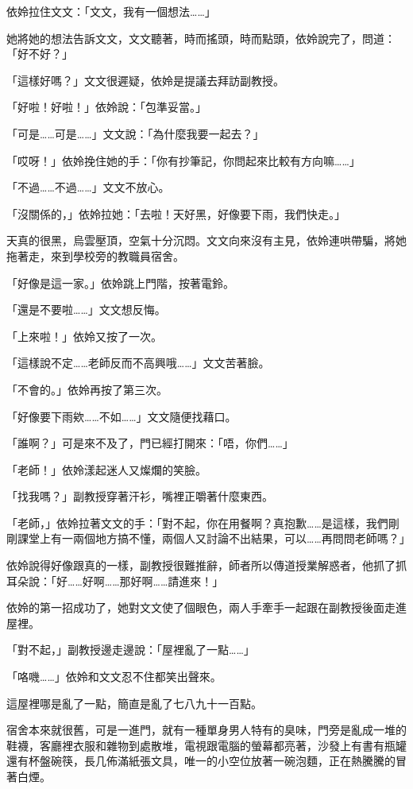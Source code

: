 依姈拉住文文：「文文，我有一個想法……」

她將她的想法告訴文文，文文聽著，時而搖頭，時而點頭，依姈說完了，問道：「好不好？」

「這樣好嗎？」文文很遲疑，依姈是提議去拜訪副教授。

「好啦！好啦！」依姈說：「包準妥當。」

「可是……可是……」文文說：「為什麼我要一起去？」

「哎呀！」依姈挽住她的手：「你有抄筆記，你問起來比較有方向嘛……」

「不過……不過……」文文不放心。

「沒關係的，」依姈拉她：「去啦！天好黑，好像要下雨，我們快走。」

天真的很黑，烏雲壓頂，空氣十分沉悶。文文向來沒有主見，依姈連哄帶騙，將她拖著走，來到學校旁的教職員宿舍。

「好像是這一家。」依姈跳上門階，按著電鈴。

「還是不要啦……」文文想反悔。

「上來啦！」依姈又按了一次。

「這樣說不定……老師反而不高興哦……」文文苦著臉。

「不會的。」依姈再按了第三次。

「好像要下雨欸……不如……」文文隨便找藉口。

「誰啊？」可是來不及了，門已經打開來：「唔，你們……」

「老師！」依姈漾起迷人又燦爛的笑臉。

「找我嗎？」副教授穿著汗衫，嘴裡正嚼著什麼東西。

「老師，」依姈拉著文文的手：「對不起，你在用餐啊？真抱歉……是這樣，我們剛剛課堂上有一兩個地方搞不懂，兩個人又討論不出結果，可以……再問問老師嗎？」

依姈說得好像跟真的一樣，副教授很難推辭，師者所以傳道授業解惑者，他抓了抓耳朵說：「好……好啊……那好啊……請進來！」

依姈的第一招成功了，她對文文使了個眼色，兩人手牽手一起跟在副教授後面走進屋裡。

「對不起，」副教授邊走邊說：「屋裡亂了一點……」

「咯嘰……」依姈和文文忍不住都笑出聲來。

這屋裡哪是亂了一點，簡直是亂了七八九十一百點。

宿舍本來就很舊，可是一進門，就有一種單身男人特有的臭味，門旁是亂成一堆的鞋襪，客廳裡衣服和雜物到處散堆，電視跟電腦的螢幕都亮著，沙發上有書有瓶罐還有杯盤碗筷，長几佈滿紙張文具，唯一的小空位放著一碗泡麵，正在熱騰騰的冒著白煙。

